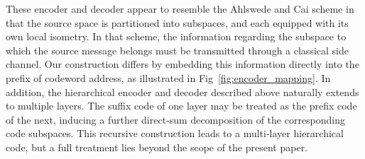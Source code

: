 \documentclass[conference]{IEEEtran}
\begin{document}
These encoder and decoder appear to resemble the Ahlswede and Cai scheme \cite{ahlswede2003lossless} in that the source space is partitioned into subspaces, and each equipped with its own local isometry. In that scheme, the information regarding the subspace to which the source message belongs must be transmitted through a classical side channel. Our construction differs by embedding this information directly into the prefix of codeword address, as illustrated in Fig~\ref{fig:encoder_mapping}. 
In addition, the hierarchical encoder and decoder described above naturally extends to multiple layers. The suffix code of one layer may be treated as the prefix code of the next, inducing a further direct‑sum decomposition of the corresponding code subspaces. This recursive construction leads to a multi‑layer hierarchical code, but a full treatment lies beyond the scope of the present paper.


\end{document}
